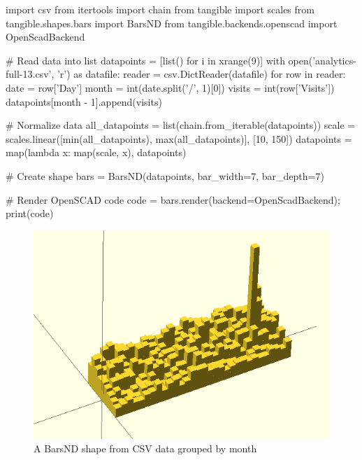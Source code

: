 \vspace{.5\baselineskip}
\begin{pythoncode}
import csv
from itertools import chain
from tangible import scales
from tangible.shapes.bars import BarsND
from tangible.backends.openscad import OpenScadBackend

# Read data into list
datapoints = [list() for i in xrange(9)]
with open('analytics-full-13.csv', 'r') as datafile:
    reader = csv.DictReader(datafile)
    for row in reader:
        date = row['Day']
        month = int(date.split('/', 1)[0])
        visits = int(row['Visits'])
        datapoints[month - 1].append(visits)

# Normalize data
all_datapoints = list(chain.from_iterable(datapoints))
scale = scales.linear([min(all_datapoints), max(all_datapoints)],
                      [10, 150])
datapoints = map(lambda x: map(scale, x), datapoints)

# Create shape
bars = BarsND(datapoints, bar_width=7, bar_depth=7)

# Render OpenSCAD code
code = bars.render(backend=OpenScadBackend); print(code)
\end{pythoncode}
\vspace{.5\baselineskip}

\begin{figure}[H]
	\centering
	\includegraphics[height=.28\textheight]{images/bars_nd.png}
	\caption{A BarsND shape from CSV data grouped by month}
	\label{img:bars_nd}
\end{figure}


